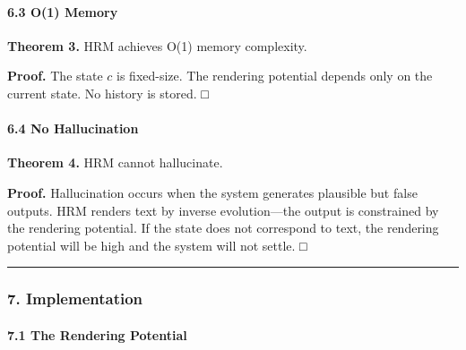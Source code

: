 \documentclass[
  11pt,
  a4paper,
]{article}
\begin{document}
\paragraph{6.3 O(1) Memory}\label{o1-memory}

\textbf{Theorem 3.} HRM achieves O(1) memory complexity.

\textbf{Proof.} The state \(c\) is fixed-size. The rendering potential
depends only on the current state. No history is stored. □

\paragraph{6.4 No Hallucination}\label{no-hallucination}

\textbf{Theorem 4.} HRM cannot hallucinate.

\textbf{Proof.} Hallucination occurs when the system generates plausible
but false outputs. HRM renders text by inverse evolution---the output is
constrained by the rendering potential. If the state does not correspond
to text, the rendering potential will be high and the system will not
settle. □

\begin{center}\rule{0.5\linewidth}{0.5pt}\end{center}

\subsubsection{7. Implementation}\label{implementation-5}

\paragraph{7.1 The Rendering Potential}\label{the-rendering-potential-2}
\end{document}
